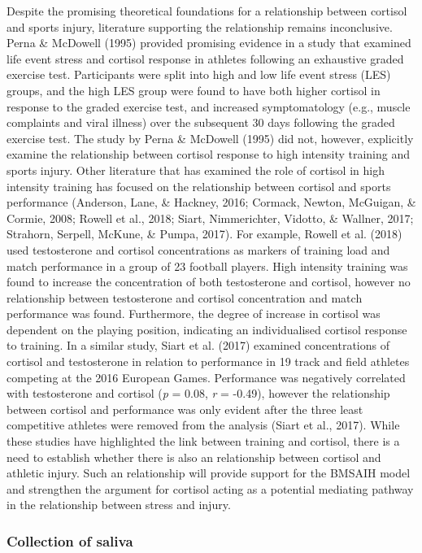 \documentclass[
  english,
  man,floatsintext]{apa6}
\begin{document}
Despite the promising theoretical foundations for a relationship between cortisol and sports injury, literature supporting the relationship remains inconclusive.
Perna \& McDowell (1995) provided promising evidence in a study that examined life event stress and cortisol response in athletes following an exhaustive graded exercise test.
Participants were split into high and low life event stress (LES) groups, and the high LES group were found to have both higher cortisol in response to the graded exercise test, and increased symptomatology (e.g., muscle complaints and viral illness) over the subsequent 30 days following the graded exercise test.
The study by Perna \& McDowell (1995) did not, however, explicitly examine the relationship between cortisol response to high intensity training and sports injury.
Other literature that has examined the role of cortisol in high intensity training has focused on the relationship between cortisol and sports performance (Anderson, Lane, \& Hackney, 2016; Cormack, Newton, McGuigan, \& Cormie, 2008; Rowell et al., 2018; Siart, Nimmerichter, Vidotto, \& Wallner, 2017; Strahorn, Serpell, McKune, \& Pumpa, 2017).
For example, Rowell et al. (2018) used testosterone and cortisol concentrations as markers of training load and match performance in a group of 23 football players.
High intensity training was found to increase the concentration of both testosterone and cortisol, however no relationship between testosterone and cortisol concentration and match performance was found.
Furthermore, the degree of increase in cortisol was dependent on the playing position, indicating an individualised cortisol response to training.
In a similar study, Siart et al. (2017) examined concentrations of cortisol and testosterone in relation to performance in 19 track and field athletes competing at the 2016 European Games.
Performance was negatively correlated with testosterone and cortisol (\emph{p} = 0.08, \emph{r} = -0.49), however the relationship between cortisol and performance was only evident after the three least competitive athletes were removed from the analysis (Siart et al., 2017).
While these studies have highlighted the link between training and cortisol, there is a need to establish whether there is also an relationship between cortisol and athletic injury.
Such an relationship will provide support for the BMSAIH model and strengthen the argument for cortisol acting as a potential mediating pathway in the relationship between stress and injury.

\hypertarget{collection-of-saliva}{%
\subsubsection{Collection of saliva}\label{collection-of-saliva}}
\end{document}
